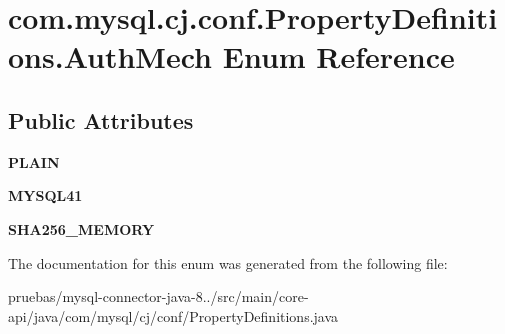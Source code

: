\hypertarget{enumcom_1_1mysql_1_1cj_1_1conf_1_1_property_definitions_1_1_auth_mech}{}\section{com.\+mysql.\+cj.\+conf.\+Property\+Definitions.\+Auth\+Mech Enum Reference}
\label{enumcom_1_1mysql_1_1cj_1_1conf_1_1_property_definitions_1_1_auth_mech}
\subsection*{Public Attributes}
\begin{DoxyCompactItemize}
\item 
\mbox{\label{enumcom_1_1mysql_1_1cj_1_1conf_1_1_property_definitions_1_1_auth_mech_a47ae7d254bd03352c6c4fb23f9fd3537}} 
{\bfseries P\+L\+A\+IN}
\item 
\mbox{\label{enumcom_1_1mysql_1_1cj_1_1conf_1_1_property_definitions_1_1_auth_mech_ad4a7c09dc0556cd1ac196d04058d16f8}} 
{\bfseries M\+Y\+S\+Q\+L41}
\item 
\mbox{\label{enumcom_1_1mysql_1_1cj_1_1conf_1_1_property_definitions_1_1_auth_mech_a2f3d0b1a3d5a5936c95a5e024f2f8a77}} 
{\bfseries S\+H\+A256\+\_\+\+M\+E\+M\+O\+RY}
\end{DoxyCompactItemize}


The documentation for this enum was generated from the following file\+:\begin{DoxyCompactItemize}
\item 
pruebas/mysql-\/connector-\/java-\/8../src/main/core-\/api/java/com/mysql/cj/conf/Property\+Definitions.\+java\end{DoxyCompactItemize}
